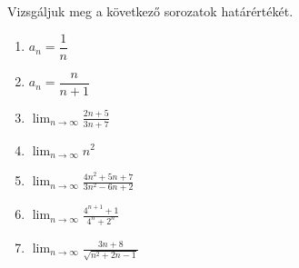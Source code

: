 \documentclass[11pt]{article}
\begin{document}
\begin{exbox}
\begin{example}
Vizsgáljuk meg a következő sorozatok határértékét.
\begin{enumerate}[label=\arabic*., itemsep=6pt]
\item $a_{n}=\dfrac{1}{n}$
\item $a_{n}=\dfrac{n}{n+1}$
\item $\displaystyle\lim_{n\to\infty}\frac{2n+5}{3n+7}$
\item $\displaystyle\lim_{n\to\infty}n^{2}$
\item $\displaystyle\lim_{n\to\infty}\frac{4n^{2}+5n+7}{3n^{2}-6n+2}$
\item $\displaystyle\lim_{n\to\infty}\frac{4^{n+1}+1}{4^{n}+2^{n}}$
\item $\displaystyle\lim_{n\to\infty}\frac{3n+8}{\sqrt{n^{2}+2n-1}}$
\end{enumerate}
\end{example}
\end{exbox}
\end{document}
